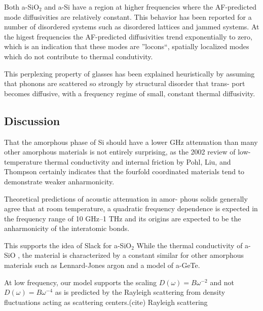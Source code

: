 \documentclass[aps,prb,twocolumn,superscriptaddress,footinbib,amsmath,amssymb,floatfix]{revtex4}
\begin{document}
Both a-SiO$_2$ and a-Si have a region at higher frequencies where the 
AF-predicted mode diffusivities are relatively constant. This behavior 
has been reported for a number of disordered systems such as 
disordered lattices
\cite{sheng_heat_1991,beltukov_ioffe-regel_2013,larkin_predicting_2013} 
and jammed systems. At the higest frequencies the AF-predicted 
diffusivities trend exponentially to zero, which is an indication 
that these modes are ''locons``, spatially localized modes which 
do not contribute to thermal condutivity.\cite{allen_diffusons_1999} 

This perplexing property of glasses
has been explained heuristically by assuming that phonons
are scattered so strongly by structural disorder that trans-
port becomes diffusive, with a frequency regime of small,
constant thermal diffusivity.
\cite{kittel_interpretation_1949,sheng_heat_1991,allen_thermal_1993} 

\subsection{\label{S:Diffusivities}Discussion}

That the amorphous phase
of Si should have a lower GHz attenuation than many other
amorphous materials is not entirely surprising, as the 2002
review of low-temperature thermal conductivity and internal
friction by Pohl, Liu, and Thompson certainly indicates that
the fourfold coordinated materials tend to demonstrate weaker
anharmonicity.\cite{pohl_low-temperature_2002}

Theoretical predictions of acoustic attenuation in amor-
phous solids generally agree that at room temperature, a
quadratic frequency dependence is expected in the frequency
range of 10 GHz–1 THz and its origins are expected to be
the anharmonicity of the interatomic bonds.

This supports the idea of Slack for a-SiO$_2$\cite{slack_thermal_1979}
While the thermal conductivity of a-SiO , the material is characterized by 
a constant similar for other amorphous
materials such as Lennard-Jones argon\cite{larkin_predicting_2013} 
and a model of a-GeTe.\cite{sosso_thermal_2012}

At low frequency, our model supports the scaling 
$D(\omega) = B \omega^{-2}$ and not $D(\omega) = B \omega^{-4}$ as is 
predicted by the Rayleigh scattering from density fluctuations acting 
as scattering centers.(cite) Rayleigh scattering 
\end{document}
